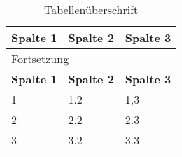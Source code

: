 \begin{longtable}[H]{|l|l|X|}%
	\caption{Tabellenüberschrift}
	\label{tab:label}
	\\ \hline
	\textbf{Spalte 1} & \textbf{Spalte 2} & \textbf{Spalte 3} \\ \hline
	\endfirsthead
	\multicolumn{3}{|l|}{Fortsetzung} \\ \hline
	\textbf{Spalte 1} & \textbf{Spalte 2} & \textbf{Spalte 3} \\ \hline
	\endhead
	1 & 1.2 & 1,3 \\ \hline
	2 & 2.2 & 2.3 \\ \hline
	3 & 3.2 & 3.3 \\ \hline
\end{longtable}

